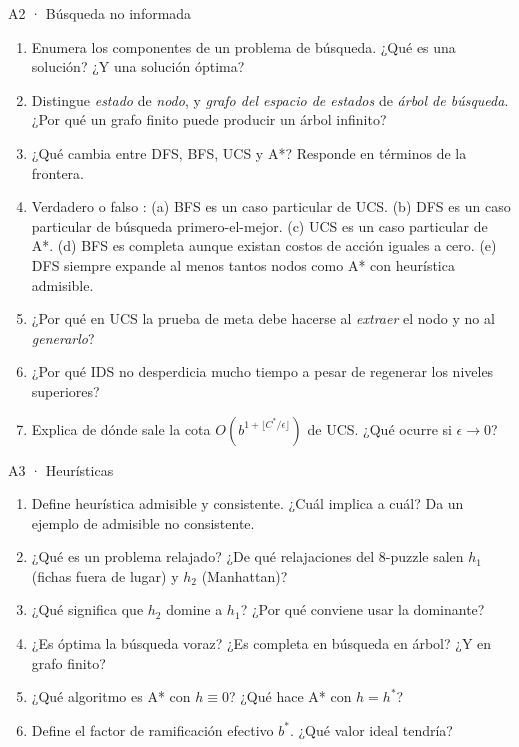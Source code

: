 \begin{ejercicio}{A2 · Búsqueda no informada }
\begin{enumerate}[label=\textbf{\arabic*.}]
\item Enumera los componentes de un problema de búsqueda. ¿Qué es una solución? ¿Y una solución óptima?
\item Distingue \emph{estado} de \emph{nodo}, y \emph{grafo del espacio de estados} de
\emph{árbol de búsqueda}. ¿Por qué un grafo finito puede producir un árbol infinito?
\item ¿Qué cambia entre DFS, BFS, UCS y A*? Responde en términos de la frontera.
\item Verdadero o falso :
(a) BFS es un caso particular de UCS. (b) DFS es un caso particular de búsqueda primero-el-mejor.
(c) UCS es un caso particular de A*. (d) BFS es completa aunque existan costos de acción iguales a cero.
(e) DFS siempre expande al menos tantos nodos como A* con heurística admisible.
\item ¿Por qué en UCS la prueba de meta debe hacerse al \emph{extraer} el nodo y no al \emph{generarlo}?
\item ¿Por qué IDS no desperdicia mucho tiempo a pesar de regenerar los niveles superiores?
\item Explica de dónde sale la cota $O(b^{1+\lfloor C^*/\epsilon\rfloor})$ de UCS. ¿Qué ocurre si $\epsilon\to 0$?
\end{enumerate}
\end{ejercicio}

\begin{ejercicio}{A3 · Heurísticas }
\begin{enumerate}[label=\textbf{\arabic*.}]
\item Define heurística admisible y consistente. ¿Cuál implica a cuál? Da un ejemplo de admisible no consistente.
\item ¿Qué es un problema relajado? ¿De qué relajaciones del 8-puzzle salen $h_1$ (fichas fuera de
lugar) y $h_2$ (Manhattan)?
\item ¿Qué significa que $h_2$ domine a $h_1$? ¿Por qué conviene usar la dominante?
\item ¿Es óptima la búsqueda voraz? ¿Es completa en búsqueda en árbol? ¿Y en grafo finito?
\item ¿Qué algoritmo es A* con $h\equiv 0$? ¿Qué hace A* con $h=h^*$?
\item Define el factor de ramificación efectivo $b^*$. ¿Qué valor ideal tendría?
\end{enumerate}
\end{ejercicio}

